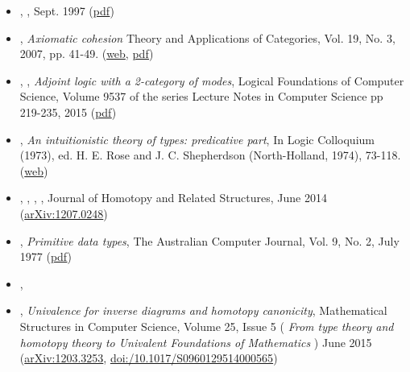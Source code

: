 \documentclass[12pt,titlepage]{article}
\theoremstyle{plain}
\theoremstyle{definition}
\theoremstyle{remark}
\begin{document}
\begin{itemize}
\item {}, , Sept. 1997 (\href{http://www.acsu.buffalo.edu/~wlawvere/ToposMotion.pdf}{pdf})


\item {}, \emph{Axiomatic cohesion} Theory and Applications of Categories, Vol. 19, No. 3, 2007, pp. 41-49. (\href{http://www.tac.mta.ca/tac/volumes/19/3/19-03abs.html}{web}, \href{http://www.tac.mta.ca/tac/volumes/19/3/19-03.pdf}{pdf})


\item {}, , \emph{Adjoint logic with a 2-category of modes}, Logical Foundations of Computer Science, Volume 9537 of the series Lecture Notes in Computer Science pp 219-235, 2015 (\href{http://dlicata.web.wesleyan.edu/pubs/ls15adjoint/ls15adjoint.pdf}{pdf})


\item {}, \emph{An intuitionistic theory of types: predicative part}, In Logic Colloquium (1973), ed. H. E. Rose and J. C. Shepherdson (North-Holland, 1974), 73-118. (\href{http://citeseerx.ist.psu.edu/viewdoc/summary?doi=10.1.1.131.926}{web})


\item {}, , , , Journal of Homotopy and Related Structures, June 2014 (\href{http://arxiv.org/abs/1207.0248}{arXiv:1207.0248})


\item {}, \emph{Primitive data types}, The Australian Computer Journal, Vol. 9, No. 2, July 1977 (\href{http://eprints.utas.edu.au/139/1/PrimitiveData.pdf}{pdf})


\item {}, 


\item {}, \emph{Univalence for inverse diagrams and homotopy canonicity}, Mathematical Structures in Computer Science, Volume 25, Issue 5 ( \emph{From type theory and homotopy theory to Univalent Foundations of Mathematics} ) June 2015 (\href{https://arxiv.org/abs/1203.3253}{arXiv:1203.3253}, \href{https://doi.org/10.1017/S0960129514000565}{doi:/10.1017/S0960129514000565})



\end{itemize}
\end{document}
